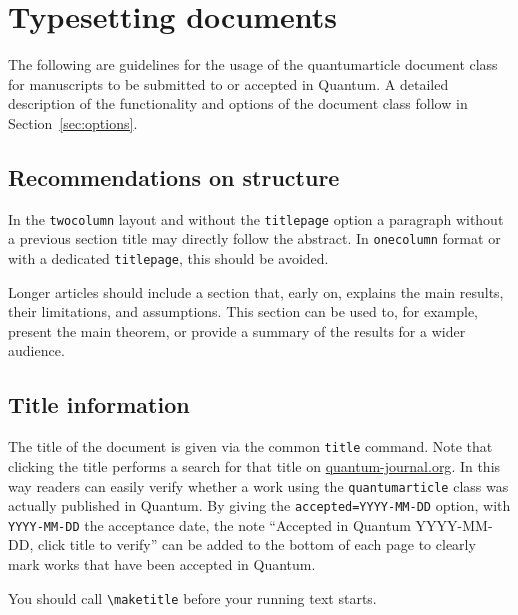 \documentclass[a4paper,noarxiv,onecolumn]{quantumarticle}
\begin{document}
	\section{Typesetting documents}

        The following are guidelines for the usage of the quantumarticle document class for manuscripts to be submitted to or accepted in Quantum. A detailed description of the functionality and options of the document class follow in Section~\ref{sec:options}.

	\subsection{Recommendations on structure}
	In the \texttt{twocolumn} layout and without the \texttt{titlepage} option a paragraph without a previous section title may directly follow the abstract.
	In \texttt{onecolumn} format or with a dedicated \texttt{titlepage}, this should be avoided.

	Longer articles should include a section that, early on, explains the main results, their limitations, and assumptions.
	This section can be used to, for example, present the main theorem, or provide a summary of the results for a wider audience.

	\subsection{Title information}
	The title of the document is given via the common \texttt{title} command. Note that clicking the title performs a search for that title on \href{http://quantum-journal.org}{quantum-journal.org}.
	In this way readers can easily verify whether a work using the \texttt{quantumarticle} class was actually published in Quantum. By giving the \texttt{accepted=YYYY-MM-DD} option, with \texttt{YYYY-MM-DD} the acceptance date, the note ``Accepted in Quantum YYYY-MM-DD, click title to verify'' can be added to the bottom of each page to clearly mark works that have been accepted in Quantum.

	You should call \texttt{\textbackslash{}maketitle} before your running text starts.
\end{document}
